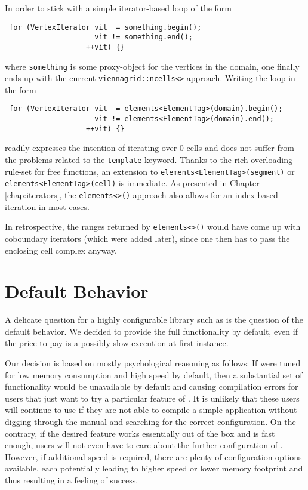  In order to stick with a simple iterator-based loop of the form
 \begin{lstlisting}
 for (VertexIterator vit  = something.begin();
                     vit != something.end();
                   ++vit) {}
 \end{lstlisting}
 where \lstinline|something| is some proxy-object for the vertices in the domain, one finally ends up with the current \lstinline|viennagrid::ncells<>| approach.
 Writing the loop in the form
 \begin{lstlisting}
 for (VertexIterator vit  = elements<ElementTag>(domain).begin();
                     vit != elements<ElementTag>(domain).end();
                   ++vit) {}
 \end{lstlisting}
 readily expresses the intention of iterating over $0$-cells and does not suffer from the problems related to the \lstinline|template| keyword.
 Thanks to the rich overloading rule-set for free functions, an extension to \lstinline|elements<ElementTag>(segment)| or \lstinline|elements<ElementTag>(cell)| is immediate.
 As presented in Chapter \ref{chap:iterators}, the \lstinline|elements<>()| approach also allows for an index-based iteration in most cases.
 
 In retrospective, the ranges returned by \lstinline|elements<>()| would have come up with coboundary iterators (which were added later), since one then has to pass the enclosing cell complex anyway.

 \section{Default Behavior}
 A delicate question for a highly configurable library such as {\ViennaGrid} is the question of the default behavior. 
 We decided to provide the full functionality by default, even if the price to pay is a possibly slow execution at first instance.

 Our decision is based on mostly psychological reasoning as follows: If {\ViennaGrid} were tuned for low memory consumption and high speed by default, then a substantial set of functionality would be unavailable by default and causing compilation errors for users that just want to try a particular feature of {\ViennaGrid}. 
 It is unlikely that these users will continue to use {\ViennaGrid} if they are not able to compile a simple application without digging through the manual and searching for the correct configuration. On the contrary, if the desired feature works essentially out of the box and is fast enough, users will not even have to care about the further configuration of {\ViennaGrid}. However, if additional speed is required, there are plenty of configuration options available, each potentially leading to higher speed or lower memory footprint and thus resulting in a feeling of success. 

